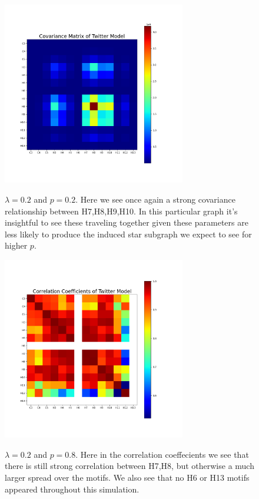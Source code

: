 \begin{figure}
    \includegraphics[width=08cm]{Images/CovMatTwitterModel020209.png}\
    \centering
    \caption{$\lambda=0.2$ and $p=0.2$. Here we see once again 
    a strong covariance relationship between H7,H8,H9,H10. In this particular graph 
    it's insightful to see these traveling together given these parameters 
    are less likely to produce the induced star subgraph we expect to see for higher $p$.}
\end{figure}

\begin{figure}
    \includegraphics[width=08cm]{Images/CorrCoefTwitterModel020809.png}\
    \centering
    \caption{$\lambda=0.2$ and $p=0.8$. Here in the correlation coeffecients we 
    see that there is still strong correlation between H7,H8, but otherwise a much
    larger spread over the motifs. We also see that no H6 or H13 motifs appeared
    throughout this simulation.}
\end{figure}


